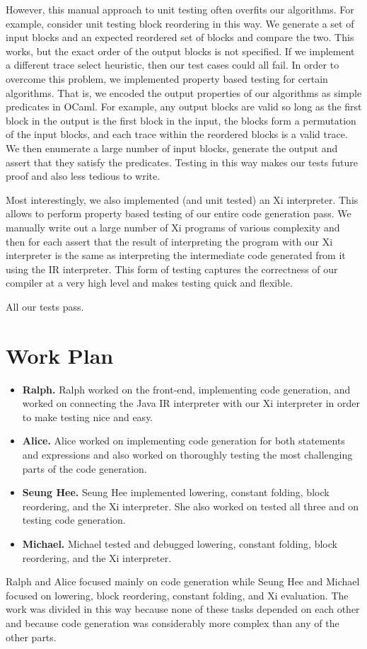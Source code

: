 \documentclass{hw}
\begin{document}
However, this manual approach to unit testing often overfits our algorithms.
For example, consider unit testing block reordering in this way. We generate a
set of input blocks and an expected reordered set of blocks and compare the
two. This works, but the exact order of the output blocks is not specified. If
we implement a different trace select heuristic, then our test cases could all
fail. In order to overcome this problem, we implemented property based testing
for certain algorithms. That is, we encoded the output properties of our
algorithms as simple predicates in OCaml. For example, any output blocks are
valid so long as the first block in the output is the first block in the input,
the blocks form a permutation of the input blocks, and each trace within the
reordered blocks is a valid trace. We then enumerate a large number of input
blocks, generate the output and assert that they satisfy the predicates.
Testing in this way makes our tests future proof and also less tedious to
write.

Most interestingly, we also implemented (and unit tested) an Xi interpreter.
This allows to perform property based testing of our entire code generation
pass. We manually write out a large number of Xi programs of various complexity
and then for each assert that the result of interpreting the program with our
Xi interpreter is the same as interpreting the intermediate code generated from
it using the IR interpreter. This form of testing captures the correctness of
our compiler at a very high level and makes testing quick and flexible.

All our tests pass.

\section{Work Plan}\label{sec:workplan}
\begin{itemize}
  \item \textbf{Ralph.}
    Ralph worked on the front-end, implementing code generation, and worked on
    connecting the Java IR interpreter with our Xi interpreter in order to make
    testing nice and easy.

  \item \textbf{Alice.}
    Alice worked on implementing code generation for both statements and
    expressions and also worked on thoroughly testing the most challenging
    parts of the code generation.

  \item \textbf{Seung Hee.}
    Seung Hee implemented lowering, constant folding, block reordering, and the
    Xi interpreter. She also worked on tested all three and on testing code
    generation.

  \item \textbf{Michael.}
    Michael tested and debugged lowering, constant folding, block reordering,
    and the Xi interpreter.
\end{itemize}
Ralph and Alice focused mainly on code generation while Seung Hee and Michael
focused on lowering, block reordering, constant folding, and Xi evaluation. The
work was divided in this way because none of these tasks depended on each other
and because code generation was considerably more complex than any of the other
parts.
\end{document}
